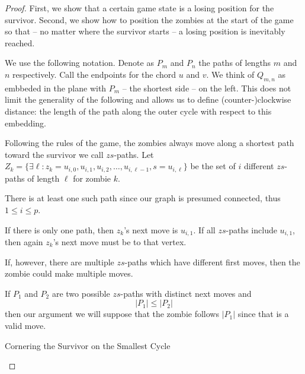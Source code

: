 \documentclass[letterpaper, 10pt]{article}
\begin{document}
\begin{proof}
 First, we show that a certain game state is a losing position for the survivor.
 Second, we show how to position the zombies at the start of the game so that --
 no matter where the survivor starts -- a losing position is inevitably reached.

 We use the following notation.
 Denote as $P_m$ and $P_n$ the paths of lengths $m$ and $n$ respectively.
 Call the endpoints for the chord $u$ and $v$.
 We think of $Q_{m,n}$ as embbeded in the plane with $P_m$
 -- the shortest side -- on the left.
 This does not limit the generality of the following and allows us to define (counter-)clockwise distance: the length of the path
 along the outer cycle with respect to this embedding.

 Following the rules of the game, the zombies always move along a shortest path toward the survivor we call $zs$-paths. Let
 $Z_k = \{  \exists \ell : z_k = u_{i,0}, u_{i, 1}, u_{i, 2}, \dots, u_{i, \ell-1}, s= u_{i, \ell}\}$ be the set of $i$ different $zs$-paths of length $\ell$ for zombie $k$.

 There is at least one such path since our graph is presumed connected,
 thus $1 \leq i \leq p$.

 If there is only one path, then $z_k$'s next move is $u_{i, 1}$. If all $zs$-paths
 include $u_{i,1}$, then again $z_k$'s next move must be to that vertex.

 If, however, there are multiple $zs$-paths which have different first moves,
 then the zombie could make multiple moves.

 If $P_1$ and $P_2$ are two possible $zs$-paths with distinct next moves and
 \[ |P_1| \leq |P_2| \]
 then our argument we will suppose that the zombie follows $|P_1|$ since that is a valid move.

 \newpage

 \begin{proofpart} Cornering the Survivor on the Smallest Cycle


\end{proofpart}
\end{proof}
\end{document}

